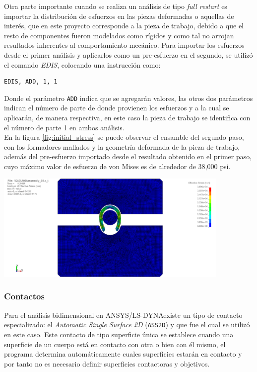 Otra parte importante cuando se realiza un análisis de tipo \textit{full restart} es importar la distribución 
de esfuerzos en las piezas deformadas o aquellas de interés, que en este proyecto corresponde a la pieza 
de trabajo, debido a que el resto de componentes fueron modelados como rígidos y como tal no arrojan resultados 
inherentes al comportamiento mecánico. Para importar los esfuerzos desde el primer análisis y aplicarlos 
como un pre-esfuerzo en el segundo, se utilizó el comando \textit{EDIS}, colocando una instrucción como:

\begin{verbatim}
EDIS, ADD, 1, 1
\end{verbatim}

Donde el parámetro \texttt{ADD} indica que se agregarán valores, las otros dos parámetros indican el número 
de parte de donde provienen los esfuerzos y a la cual se aplicarán, de manera respectiva, en este caso 
la pieza de trabajo se identifica con el número de parte 1 en ambos análisis. \\

En la figura \ref{fig:initial_stress} se puede observar el ensamble del segundo paso, con los formadores 
mallados y la geometría deformada de la pieza de trabajo, además del pre-esfuerzo importado desde el resultado 
obtenido en el primer paso, cuyo máximo valor de esfuerzo de von Mises es de alrededor de 38,000 psi.

\begin{center}
\includegraphics[width=0.85\textwidth]{src/ch3/initial_stress.png}
\label{fig:initial_stress}
\end{center}

\subsubsection{Contactos}\label{sec:contactos}

Para el análisis bidimensional en ANSYS/LS-DYNA\CR existe un tipo de contacto especializado: 
el \textit{Automatic Single Surface 2D} (\texttt{ASS2D}) y que fue el cual se utilizó en este caso. 
Este contacto de tipo superficie única se establece cuando una superficie de un cuerpo está 
en contacto con otra o bien con él mismo, el programa determina automáticamente cuales superficies 
estarán en contacto y por tanto no es necesario definir superficies contactoras y objetivos.\\

